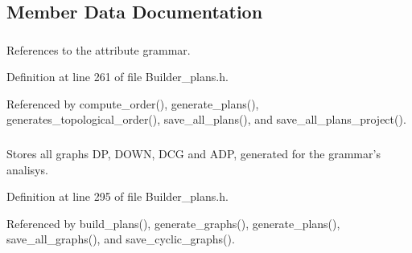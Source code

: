 \subsection{Member Data Documentation}
\hypertarget{classgenevalmag_1_1Builder__plans_a247759aafc18133de19c8c95afb9c2d5}{
\subsubsection[{attr\_\-grammar}]{}}
\label{classgenevalmag_1_1Builder__plans_a247759aafc18133de19c8c95afb9c2d5}


References to the attribute grammar. 



Definition at line 261 of file Builder\_\-plans.h.



Referenced by compute\_\-order(), generate\_\-plans(), generates\_\-topological\_\-order(), save\_\-all\_\-plans(), and save\_\-all\_\-plans\_\-project().

\hypertarget{classgenevalmag_1_1Builder__plans_ac1d890f07dc50cc1d7383a73bb5bb5af}{
\subsubsection[{build\_\-graphs}]{}}
\label{classgenevalmag_1_1Builder__plans_ac1d890f07dc50cc1d7383a73bb5bb5af}


Stores all graphs DP, DOWN, DCG and ADP, generated for the grammar's analisys. 



Definition at line 295 of file Builder\_\-plans.h.



Referenced by build\_\-plans(), generate\_\-graphs(), generate\_\-plans(), save\_\-all\_\-graphs(), and save\_\-cyclic\_\-graphs().

